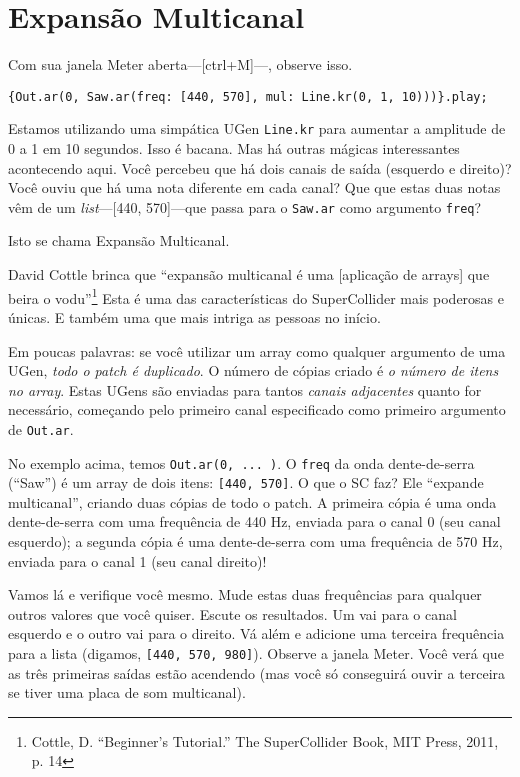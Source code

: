 \section{Expansão Multicanal}

Com sua janela Meter aberta---[ctrl+M]---, observe isso.

\begin{lstlisting}[style=SuperCollider-IDE, basicstyle=\scttfamily\footnotesize]
{Out.ar(0, Saw.ar(freq: [440, 570], mul: Line.kr(0, 1, 10)))}.play;
\end{lstlisting}

Estamos utilizando uma simpática UGen \texttt{Line.kr} para aumentar a amplitude de 0 a 1 em 10 segundos. Isso é bacana. Mas há outras mágicas interessantes acontecendo aqui. Você percebeu que há dois canais de saída (esquerdo e direito)? Você ouviu que há uma nota diferente em cada canal? Que que estas duas notas vêm de um \emph{list}---[440, 570]---que passa para o \texttt{Saw.ar} como argumento \texttt{freq}?

Isto se chama Expansão Multicanal.

David Cottle brinca que “expansão multicanal é uma [aplicação de arrays] que beira o vodu”\footnote{Cottle, D. ``Beginner's Tutorial.'' The SuperCollider Book, MIT Press, 2011, p. 14} Esta é uma das características do SuperCollider mais poderosas e únicas. E também uma que mais intriga as pessoas no início.

Em poucas palavras: se você utilizar um array como qualquer argumento de uma UGen, \emph{todo o patch é duplicado}. O número de cópias criado é \textit{o número de itens no array}. Estas UGens são enviadas para tantos \textit{canais adjacentes} quanto for necessário, começando pelo primeiro canal especificado como primeiro argumento de \texttt{Out.ar}.

No exemplo acima, temos \texttt{Out.ar(0, ... )}. O \texttt{freq} da onda dente-de-serra (“Saw”) é um array de dois itens: \texttt{[440, 570]}. O que o SC faz? Ele “expande multicanal”, criando duas cópias de todo o patch. A primeira cópia é uma onda dente-de-serra com uma frequência de 440 Hz, enviada para o canal 0 (seu canal esquerdo); a segunda cópia é uma dente-de-serra com uma frequência de 570 Hz, enviada para o canal 1 (seu canal direito)!

Vamos lá e verifique você mesmo. Mude estas duas frequências para qualquer outros valores que você quiser. Escute os resultados. Um vai para o canal esquerdo e o outro vai para o direito. Vá além e adicione uma terceira frequência para a lista (digamos, \texttt{[440, 570, 980]}). Observe a janela Meter. Você verá que as três primeiras saídas estão acendendo (mas você só conseguirá ouvir a terceira se tiver uma placa de som multicanal).

